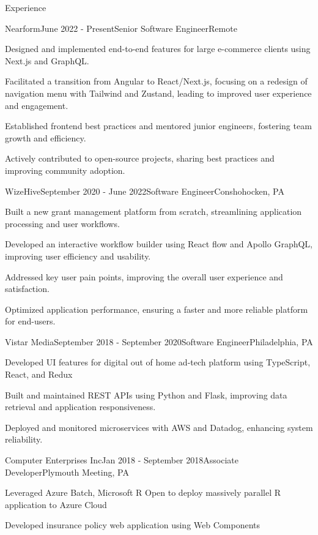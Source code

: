 \documentclass{resume} %
\begin{document}
\begin{rSection}{Experience}
\begin{rSubsection}{Nearform}{June 2022 - Present}{Senior Software Engineer}{Remote}
\item Designed and implemented end-to-end features for large e-commerce clients using Next.js and GraphQL.
\item Facilitated a transition from Angular to React/Next.js, focusing on a redesign of navigation menu with Tailwind and Zustand, leading to improved user experience and engagement.
\item Established frontend best practices and mentored junior engineers, fostering team growth and efficiency.
\item Actively contributed to open-source projects, sharing best practices and improving community adoption.
\end{rSubsection}

\begin{rSubsection}{WizeHive}{September 2020 - June 2022}{Software Engineer}{Conshohocken, PA}
\item Built a new grant management platform from scratch, streamlining application processing and user workflows.
\item Developed an interactive workflow builder using React flow and Apollo GraphQL, improving user efficiency and usability.
\item Addressed key user pain points, improving the overall user experience and satisfaction.
\item Optimized application performance, ensuring a faster and more reliable platform for end-users.
\end{rSubsection}

\begin{rSubsection}{Vistar Media}{September 2018 - September 2020}{Software Engineer}{Philadelphia, PA}
\item Developed UI features for digital out of home ad-tech platform using TypeScript, React, and Redux
\item Built and maintained REST APIs using Python and Flask, improving data retrieval and application responsiveness.
\item Deployed and monitored microservices with AWS and Datadog, enhancing system reliability.
\end{rSubsection}

\begin{rSubsection}{Computer Enterprises Inc}{Jan 2018 - September 2018}{Associate Developer}{Plymouth Meeting, PA}
\item Leveraged Azure Batch, Microsoft R Open to deploy massively parallel R application to Azure Cloud
\item Developed insurance policy web application using Web Components
\end{rSubsection}


\end{rSection}
\end{document}
